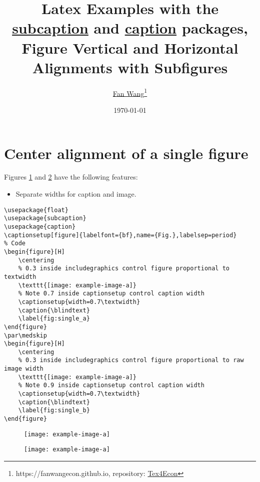 \documentclass[12pt,english]{article}
\title{Latex Examples with the \href{https://ctan.org/pkg/subcaption?lang=en}{subcaption} and \href{https://ctan.org/pkg/caption?lang=en}{caption} packages, Figure Vertical and Horizontal Alignments with Subfigures}
\author{\href{https://fanwangecon.github.io/}{Fan Wang}\thanks{https://fanwangecon.github.io, repository: \href{https://fanwangecon.github.io/Tex4Econ/}{Tex4Econ}}}
\date{\today}
\begin{document}
\maketitle
\tableofcontents
\clearpage 

\section{Center alignment of a single figure}

Figures \ref{fig:single_a} and \ref{fig:single_b} have the following features:
\begin{itemize}
    \item Separate widths for caption and image.
\end{itemize}

\begin{lstlisting}[frame=single]
% Included Package
\usepackage{float}
\usepackage{subcaption}
\usepackage{caption}
\captionsetup[figure]{labelfont={bf},name={Fig.},labelsep=period}
% Code
\begin{figure}[H]
    \centering
    % 0.3 inside includegraphics control figure proportional to textwidth
	\texttt{[image: example-image-a]}
	% Note 0.7 inside captionsetup control caption width
	\captionsetup{width=0.7\textwidth}
	\caption{\blindtext}
	\label{fig:single_a}
\end{figure}
\par\medskip
\begin{figure}[H]
    \centering
    % 0.3 inside includegraphics control figure proportional to raw image width
	\texttt{[image: example-image-a]}
	% Note 0.9 inside captionsetup control caption width
	\captionsetup{width=0.7\textwidth}
	\caption{\blindtext}
	\label{fig:single_b}
\end{figure}
\end{lstlisting}

\par\medskip
\begin{figure}[H]
    \centering
	\texttt{[image: example-image-a]}
	\captionsetup{width=0.7\textwidth}
	\caption{\blindtext}
	\label{fig:single_a}
\end{figure}
\par\medskip
\begin{figure}[H]
    \centering
	\texttt{[image: example-image-a]}
	\captionsetup{width=0.7\textwidth}
	\caption{\blindtext}
	\label{fig:single_b}
\end{figure}
\end{document}
